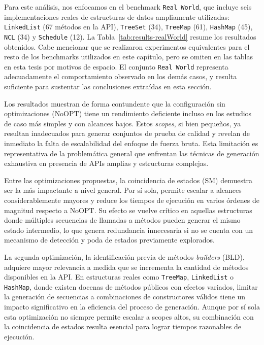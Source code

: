 Para este análisis, nos enfocamos en el benchmark \texttt{Real World}, que incluye seis 
implementaciones reales de estructuras de datos ampliamente utilizadas: \texttt{LinkedList} 
(67 métodos en la API), \texttt{TreeSet} (34), \texttt{TreeMap} (61), \texttt{HashMap} (45), \texttt{NCL} (34) y 
\texttt{Schedule} (12). La Tabla~\ref{tab:results-realWorld} 
resume los resultados obtenidos. Cabe mencionar que se realizaron experimentos equivalentes para 
el resto de los benchmarks utilizados en este capítulo, pero se omiten en las tablas en esta tesis por motivos de espacio.
El conjunto \texttt{Real World} representa adecuadamente el comportamiento observado en los demás casos, 
y resulta suficiente para sustentar las conclusiones extraídas en esta sección.

Los resultados muestran de forma contundente que la configuración sin optimizaciones (\textsf{NoOPT}) 
tiene un rendimiento deficiente incluso en los estudios de caso más simples y con alcances bajos. 
Estos \emph{scopes}, si bien pequeños, ya resultan inadecuados para generar conjuntos de prueba de 
calidad y revelan de inmediato la falta de escalabilidad del enfoque de fuerza bruta. Esta limitación 
es representativa de la problemática general que enfrentan las técnicas de generación exhaustiva en 
presencia de APIs amplias y estructuras complejas.

Entre las optimizaciones propuestas, la coincidencia de estados (\textsf{SM}) demuestra ser la más 
impactante a nivel general. Por sí sola, permite escalar a alcances considerablemente mayores y reduce 
los tiempos de ejecución en varios órdenes de magnitud respecto a \textsf{NoOPT}. Su efecto se vuelve 
crítico en aquellas estructuras donde múltiples secuencias de llamadas a métodos pueden generar el mismo estado 
intermedio, lo que genera redundancia innecesaria si no se cuenta con un mecanismo de detección y poda 
de estados previamente explorados.

La segunda optimización, la identificación previa de métodos \emph{builders} (\textsf{BLD}), adquiere 
mayor relevancia a medida que se incrementa la cantidad de métodos disponibles en la API. En 
estructuras reales como \texttt{TreeMap}, \texttt{LinkedList} o \texttt{HashMap}, donde existen 
docenas de métodos públicos con efectos variados, limitar la generación de secuencias a combinaciones 
de constructores válidos tiene un impacto significativo en la eficiencia del proceso de generación. 
Aunque por sí sola esta optimización no siempre permite escalar a scopes altos, su combinación con la 
coincidencia de estados resulta esencial para lograr tiempos razonables de ejecución.

